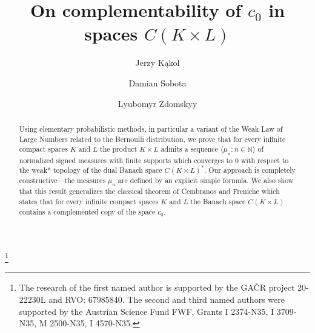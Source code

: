 \documentclass[11pt]{amsart}
\theoremstyle{definition}
\theoremstyle{remark}
\numberwithin{equation}{section}
\begin{document}
\title[Complementability of $c_0$ in spaces $C(K\times L)$]{On complementability of $c_0$ in spaces $C(K\times L)$}
\author[J. K\k{a}kol]{Jerzy K\k{a}kol}
\address{Faculty of Mathematics and Computer Science, A. Mickiewicz University, Pozna\'n, Poland, and Institute of Mathematics, Czech Academy of Sciences, Prague, Czech Republic.}
\author[D.\ Sobota]{Damian Sobota}
\address{Universit\"at Wien, Institut f\"ur Mathematik, Kurt G\"odel Research Center, Wien, Austria.}
\author[L. Zdomskyy]{Lyubomyr Zdomskyy}
\address{Universit\"at Wien, Institut f\"ur Mathematik, Kurt G\"odel Research Center, Wien, Austria.}
\thanks{The research of the first  named author is supported by the GA\v{C}R project 20-22230L and RVO: 67985840. The second and third named authors were supported by the Austrian Science Fund FWF, Grants I 2374-N35, I 3709-N35, M 2500-N35, I 4570-N35.}


\begin{abstract}
Using elementary probabilistic methods, in particular a variant of the Weak Law of Large Numbers related to the Bernoulli distribution, we prove that for every infinite compact spaces $K$ and $L$ the product $K\times L$ admits a sequence $\langle\mu_n\colon n\in\mathbb{N}\rangle$ of normalized signed measures with finite supports which converges to $0$ with respect to the weak* topology of the dual Banach space $C(K\times L)^*$. Our approach is completely constructive---the measures $\mu_n$ are defined by an explicit simple formula. We also show that this result generalizes the classical theorem of Cembranos and Freniche which states that for every infinite compact spaces $K$ and $L$ the Banach space $C(K\times L)$ contains a complemented copy of the space $c_0$.
\end{abstract}
\end{document}
